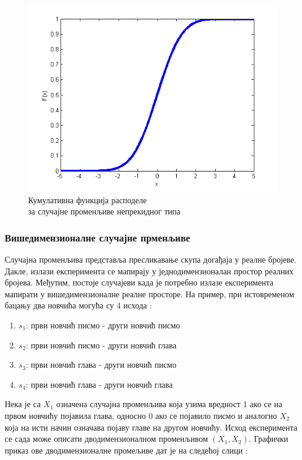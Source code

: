 \begin{figure}[H]
    \centering
\captionsetup{justification=centering}
   \includegraphics[scale=0.5]{./Slike/cdf.png} 
	\caption{Кумулативна функција расподеле \\ за случајне променљиве непрекидног типа} 
	\label{fig:slika13}
\end{figure}



\subsubsection{Вишедимензионалне случајне прменљиве}

Случајна променљива представља пресликавање скупа догађаја у реалне бројеве. Дакле, излази експеримента се мапирају у једнодимензионалан простор реалних бројева. Међутим, постоје случајеви када је потребно излазе експеримента мапирати у вишедимензионалне реалне просторе. На пример, при истовременом бацању два новчића могућа су 4 исхода :
\begin{enumerate}
\item $s_1$: први новчић писмо - други новчић писмо
\item $s_2$: први новчић писмо - други новчић глава
\item $s_3$: први новчић глава - други новчић писмо
\item $s_4$: први новчић глава - други новчић глава
\end{enumerate}

Нека је са $X_1$ означена случајна променљива која узима вредност 1 ако се на првом новчићу појавила глава, односно 0 ако се појавило писмо и аналогно $X_2$ која на исти начин означава појаву главе на другом новчићу. Исход експеримента се сада може описати дводимензионалном променљивом $(X_1,X_2)$. Графички приказ ове дводимензионалне промељиве дат је на следећој слици :

